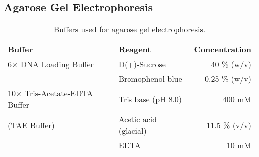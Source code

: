 \subsection{Agarose Gel Electrophoresis}
\bigskip
\begin{table}[H]
\begin{center}
\captionsetup{justification=centering}
\caption[Agarose Gel Electrophoresis Buffers]{Buffers used for agarose gel electrophoresis.}
\vspace{.5cm}
\begin{tabular}{l l r}
\hline
\label{Gel electrophoresis}
\textbf{Buffer} & \textbf{Reagent} & \textbf{Concentration}\Tstrut\Bstrut\\
\hline
6$\times$ DNA Loading Buffer & D(+)-Sucrose & 40 \% (w/v) \\
& Bromophenol blue & 0.25 \% (w/v)\\ [0.3 cm]
10$\times$ Tris-Acetate-EDTA Buffer & Tris base (pH 8.0) & 400 mM \\
(TAE Buffer) & Acetic acid (glacial) & 11.5 \% (v/v) \\
& EDTA & 10 mM \\[.8ex]
\hline
\end{tabular}
\end{center}
\end{table}

